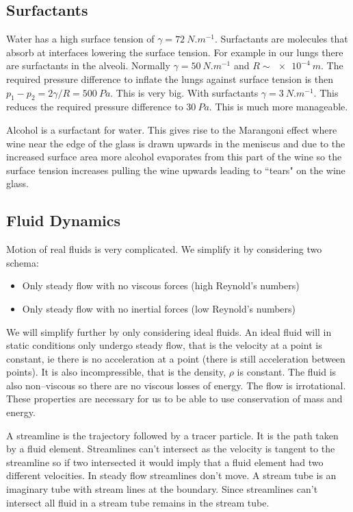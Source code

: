\documentclass{article}
\begin{document}
    \subsection{Surfactants}
    Water has a high surface tension of \(\gamma = \SI{72}{N.m^{-1}}\).
    Surfactants are molecules that absorb at interfaces lowering the surface tension.
    For example in our lungs there are surfactants in the alveoli.
    Normally \(\gamma = \SI{50}{N.m^{-1}}\) and \(R \sim \SI{e-4}{m}\).
    The required pressure difference to inflate the lungs against surface tension is then \(p_1 - p_2 = 2\gamma/R = \SI{500}{Pa}\).
    This is very big.
    With surfactants \(\gamma = \SI{3}{N.m^{-1}}\).
    This reduces the required pressure difference to \(\SI{30}{Pa}\).
    This is much more manageable.
    
    Alcohol is a surfactant for water.
    This gives rise to the Marangoni effect where wine near the edge of the glass is drawn upwards in the meniscus and due to the increased surface area more alcohol evaporates from this part of the wine so the surface tension increases pulling the wine upwards leading to ``tears" on the wine glass.
    
    \subsection{Fluid Dynamics} 
    Motion of real fluids is very complicated.
    We simplify it by considering two schema:
    \begin{itemize}
        \item Only steady flow with no viscous forces (high Reynold's numbers)
        \item Only steady flow with no inertial forces (low Reynold's numbers)
    \end{itemize}
    We will simplify further by only considering ideal fluids.
    An ideal fluid will in static conditions only undergo steady flow, that is the velocity at a point is constant, ie there is no acceleration at a point (there is still acceleration between points).
    It is also incompressible, that is the density, \(\rho\) is constant.
    The fluid is also non--viscous so there are no viscous losses of energy.
    The flow is irrotational.
    These properties are necessary for us to be able to use conservation of mass and energy.
    
    A streamline is the trajectory followed by a tracer particle.
    It is the path taken by a fluid element.
    Streamlines can't intersect as the velocity is tangent to the streamline so if two intersected it would imply that a fluid element had two different velocities.
    In steady flow streamlines don't move.
    A stream tube is an imaginary tube with stream lines at the boundary.
    Since streamlines can't intersect all fluid in a stream tube remains in the stream tube.
    
\end{document}
